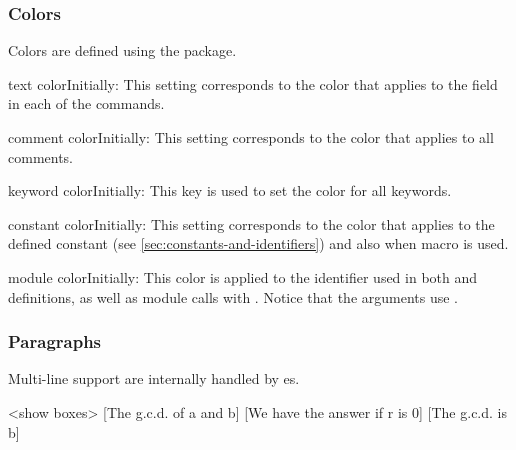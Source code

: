 \documentclass[a4paper, 11pt]{article}
\begin{document}
\subsubsection{Colors}\label{sec:colors}
Colors are defined using the  package.

\begin{Optiondef}{text color}{}{Initially: }
    This setting corresponds to the color that applies to the  field in each of the commands.
\end{Optiondef}

\begin{Optiondef}{comment color}{}{Initially: }
    This setting corresponds to the color that applies to all comments.
\end{Optiondef}

\begin{Optiondef}{keyword color}{}{Initially: }
    This key is used to set the color for all keywords.
\end{Optiondef}

\begin{Optiondef}{constant color}{}{Initially: }
    This setting corresponds to the color that applies to the defined constant (see \cref{sec:constants-and-identifiers}) and also when macro  is used.
\end{Optiondef}

\begin{Optiondef}{module color}{}{Initially: }
    This color is applied to the identifier used in both  and  definitions, as well as module calls with . Notice that the arguments use .
\end{Optiondef}

\subsubsection{Paragraphs}
Multi-line support are internally handled by es.

\medskip
\begingroup
\begin{algorithmic}<show boxes>
    [The g.c.d. of a and b]
        [We have the answer if r is 0]
        \EndWhile
        [The g.c.d. is b]
    \EndProcedure
\end{algorithmic}
\endgroup
\end{document}
